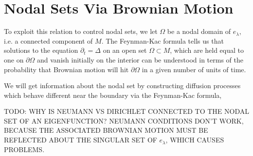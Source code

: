 \begin{comment}
The \emph{Feynman-Kac formula} extends this kind of analysis from the Dirichlet problem to the study of more general solutions to the heat equation $\partial_t u = \Delta u$.

 is a version of this result

For our purposes, we are interested in the \emph{Feynman-Kac} formula. For an open set $\Omega \subset \RR^d$, $f \in L^2(\Omega)$, $x \in \Omega$, and $t > 0$, we find that
%
\[ e^{t \Delta} f(x) = \frac{\EE[ f(B^x_t) | H_\Omega > t ]}{\PP(H^x_\Omega > t)}, \]
%
where
%
\begin{itemize}
    \item $B^x$ is a standard Brownian motion beginning at $x$.
    \item $H^x_\Omega$ is the time that $B^x$ hits $\partial \Omega$.
\end{itemize}
%
Thus, in particular,
%
\[ e^{-\lambda^2 t} e_\lambda(x) = \frac{\EE[ e_\lambda(B^x_t) | H^x_\Omega ]}{\PP(H^\Omega_x > t)} \]
%
One can again understand $H_{\Omega,x}$ by `reversing time' in a certain sense. The probability that Brownian motion will have left $\Omega$ at a certain time is equal to the probability that a Brownian motion starting uniformly on the boundary will reach $x$. Thus
%
\[ u(x,t) = \PP(H_{\Omega,x} > t) \]
%
is a solution to the heat equation, such that $u(x,t) = 1$ on $\partial \Omega$, and starts equal to zero on $\Omega$.
\end{comment}

\section{Nodal Sets Via Brownian Motion}

To exploit this relation to control nodal sets, we let $\Omega$ be a nodal domain of $e_\lambda$, i.e. a connected component of $M$. The Feynman-Kac formula tells us that solutions to the equation $\partial_t = \Delta$ on an open set $\Omega \subset M$, which are held equal to one on $\partial \Omega$ and vanish initially on the interior can be understood in terms of the probability that Brownian motion will hit $\partial \Omega$ in a given number of units of time.



We will get information about the nodal set by constructing diffusion processes which behave different near the boundary via the Feynman-Kac formula,

TODO: WHY IS NEUMANN VS DIRICHLET CONNECTED TO THE NODAL SET OF AN EIGENFUNCTION? NEUMANN CONDITIONS DON'T WORK, BECAUSE THE ASSOCIATED BROWNIAN MOTION MUST BE REFLECTED ABOUT THE SINGULAR SET OF $e_\lambda$, WHICH CAUSES PROBLEMS.

